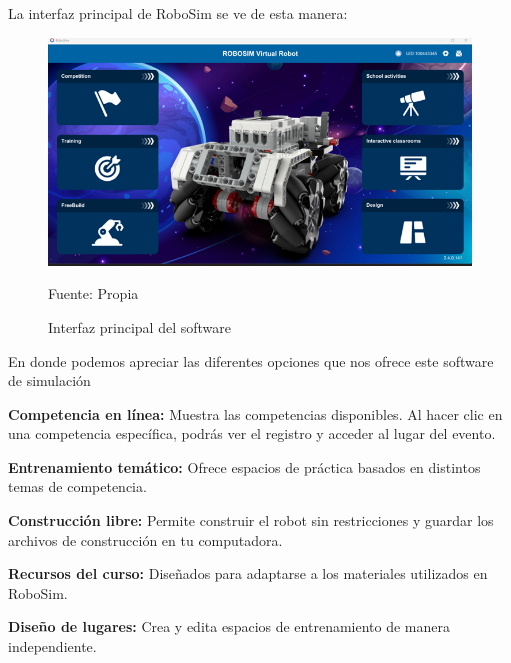 La interfaz principal de RoboSim se ve de esta manera: 

\begin{figure}[H]
    \centering
    \includegraphics[scale = 0.70]{Imagenes/interfaz1.png}
    \caption{Interfaz principal del software}{Fuente: Propia}
\end{figure}

En donde podemos apreciar las diferentes opciones que nos ofrece este software de simulación

\textbf{Competencia en línea:} Muestra las competencias disponibles. Al hacer clic en una competencia específica, podrás ver el registro y acceder al lugar del evento.

\textbf{Entrenamiento temático:} Ofrece espacios de práctica basados en distintos temas de competencia.

\textbf{Construcción libre:} Permite construir el robot sin restricciones y guardar los archivos de construcción en tu computadora.

\textbf{Recursos del curso:} Diseñados para adaptarse a los materiales utilizados en RoboSim.

\textbf{Diseño de lugares:} Crea y edita espacios de entrenamiento de manera independiente.
